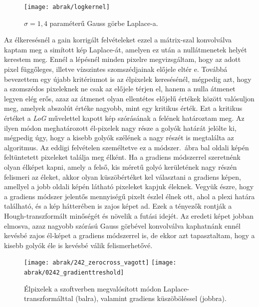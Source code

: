 \documentclass[a4paper,12pt]{article}
\begin{document}
\begin{figure}[htbp]
\center
\texttt{[image: abrak/logkernel]}
\caption{$\sigma = 1,\!4$ paraméterű Gauss görbe Laplace-a.}
\label{fig:logkernel}
\end{figure}


Az élkeresésnél a gain korrigált felvételeket ezzel a mátrix-szal konvolválva kaptam meg a simított kép Laplace-át, amelyen ez után a nullátmenetek helyét kerestem meg. Ennél a lépésnél minden pixelre megvizsgáltam, hogy az adott pixel függőleges, illetve vízszintes szomszédjainak előjele eltér e. Továbbá bevezettem egy újabb kritériumot is az  élpixelek keresésénél, mégpedig azt, hogy a szomszédos pixeleknek ne csak az előjele térjen el, hanem a nulla átmenet legyen elég erős, azaz az átmenet olyan ellentétes előjelű értékek között valósuljon meg, amelyek abszolút értéke nagyobb, mint egy kritikus érték. Ezt a kritikus értéket a \emph{LoG} művelettel kapott kép szórásának a felének határoztam meg. Az ilyen módon meghatározott él-pixelek nagy része a golyók határát jelölte ki, mégpedig úgy, hogy a kisebb golyók szélének a nagy részét is megtalálta az algoritmus. Az eddigi felvételen személtetve ez a módszer.~ábra bal oldali képén feltüntetett pixeleket találja meg élként. Ha a gradiens módszerrel szeretnénk olyan élképet kapni, amely a felső, kis méretű golyó kerületének nagy részén felismeri az éleket, akkor olyan küszöbértéket kel választani a gradiens képen, amellyel a jobb oldali képén látható pixeleket kapjuk éleknek. Vegyük észre, hogy a gradiens módszer jelentős mennyiségű pixelt észlel élnek ott, ahol a plexi határa található, és a kép hátterében is zajos képet ad. Ezek a tényezők rontják a Hough-transzformált minőségét és növelik a futási idejét. Az eredeti képet jobban elmosva, azaz nagyobb szórású Gauss görbével konvolválva kaphatnánk ennél kevésbé zajos él-képet a gradiens módszerrel is, de ekkor azt tapasztaltam, hogy a kisebb golyók éle is kevésbé válik felismerhetővé. 


\begin{figure}[htbp]
\center
\texttt{[image: abrak/242\_zerocross\_vagott]}
\texttt{[image: abrak/0242\_gradienttreshold]}
\caption{Élpixelek a szoftverben megvalósított módon Laplace-transzformálttal (balra), valamint gradiens küszöböléssel (jobbra).}
\label{fig:242_circles}
\end{figure}
\end{document}
